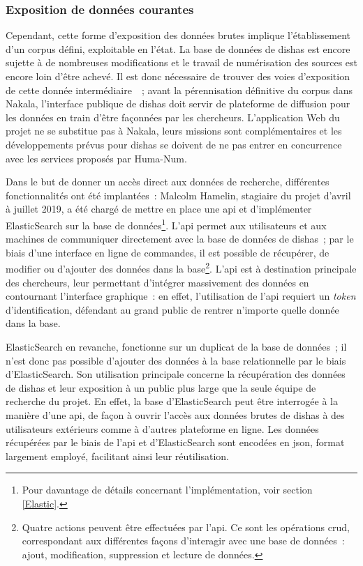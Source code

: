 \documentclass[a4paper,12pt,twoside]{book}
\newcommand{\eng}{\emph}
\newcommand{\bdd}{base de données\xspace}
\newcommand{\g}[1]{\og#1~\fg}
\newcommand{\dishas}{\gls{dishas}\xspace}
\newcommand{\api}{\gls{api}\xspace}
\newcommand{\json}{\gls{json}\xspace}
\newcommand{\crud}{\gls{crud}\xspace}
\begin{document}
			\subsubsection{Exposition de données courantes}
Cependant, cette forme d'exposition des données brutes implique l'établissement d'un corpus défini, exploitable en l'état. La \bdd de \dishas est encore sujette à de nombreuses modifications et le travail de numérisation des sources est encore loin d'être achevé. Il est donc nécessaire de trouver des voies d'exposition de cette donnée \g{intermédiaire}~; avant la pérennisation définitive du corpus dans Nakala, l'interface publique de \dishas doit servir de plateforme de diffusion pour les données en train d'être façonnées par les chercheurs. L'application Web du projet ne se substitue pas à Nakala, leurs missions sont complémentaires et les développements prévus pour \dishas se doivent de ne pas entrer en concurrence avec les services proposés par Huma-Num.

Dans le but de donner un accès direct aux données de recherche, différentes fonctionnalités ont été implantées~: Malcolm Hamelin, stagiaire du projet d'avril à juillet 2019, a été chargé de mettre en place une \api et d'implémenter ElasticSearch sur la \bdd\footnote{Pour davantage de détails concernant l'implémentation, voir section \ref{Elastic}.}. L'\api permet aux utilisateurs et aux machines de communiquer directement avec la \bdd de \dishas~; par le biais d'une interface en ligne de commandes, il est possible de récupérer, de modifier ou d'ajouter des données dans la base\footnote{Quatre actions peuvent être effectuées par l'\api. Ce sont les opérations \crud, correspondant aux différentes façons d'interagir avec une \bdd~: ajout, modification, suppression et lecture de données.}. L'\api est à destination principale des chercheurs, leur permettant d'intégrer massivement des données en contournant l'interface graphique~: en effet, l'utilisation de l'\api requiert un \eng{token} d'identification, défendant au grand public de rentrer n'importe quelle donnée dans la base.

ElasticSearch en revanche, fonctionne sur un duplicat de la \bdd~; il n'est donc pas possible d'ajouter des données à la base relationnelle par le biais d'ElasticSearch. Son utilisation principale concerne la récupération des données de \dishas et leur exposition à un public plus large que la seule équipe de recherche du projet. En effet, la base d'ElasticSearch peut être interrogée à la manière d'une \api, de façon à ouvrir l'accès aux données brutes de \dishas à des utilisateurs extérieurs comme à d'autres plateforme en ligne. Les données récupérées par le biais de l'\api et d'ElasticSearch sont encodées en \json, format largement employé, facilitant ainsi leur réutilisation.
\end{document}
